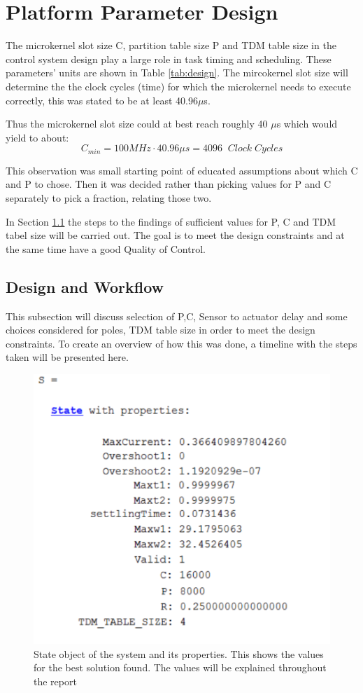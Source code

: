 \section{Platform Parameter Design}
\label{sec:platform}

The microkernel slot size C, partition table size P and TDM table size in the control system design play a large role in task timing and scheduling. These parameters' units are shown in Table \ref{tab:design}. The mircokernel slot size will determine the the clock cycles (time) for which the microkernel needs to execute correctly, this was stated to be at least 40.96$\mu$s.

Thus the microkernel slot size could at best reach roughly 40 $\mu$s which would yield to about: $$ C_{min} = 100MHz \cdot 40.96 \mu s = 4096 \;\;Clock \; Cycles$$

This observation was small starting point of educated assumptions about which C and P to chose. Then it was decided rather than picking values for P and C separately to pick a fraction, relating those two. 

In Section \ref{sec:steps} the steps to the findings of sufficient values for P, C and TDM tabel size will be carried out. The goal is to meet the design constraints and at the same time have a good Quality of Control.

\subsection{Design and Workflow}
\label{sec:steps}
This subsection will discuss selection of P,C, Sensor to actuator delay and some choices considered for poles, TDM table size in order to meet the design constraints. To create an overview of how this was done, a timeline with the steps taken will be presented here.

\begin{figure}[h!]
	\begin{center}
		\includegraphics[width=0.5\linewidth]{img/S}
		\caption{State object of the system and its properties. This shows the values for the best solution found. The values will be explained throughout the report}
		\label{fig:S}
	\end{center}
\end{figure}


